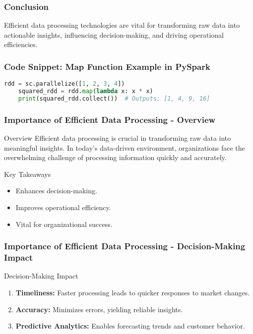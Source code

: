 \documentclass[aspectratio=169]{beamer}
\begin{document}
\begin{frame}[fragile]
    \frametitle{Conclusion}
    Efficient data processing technologies are vital for transforming raw data into actionable insights, influencing decision-making, and driving operational efficiencies.
\end{frame}

\begin{frame}[fragile]
    \frametitle{Code Snippet: Map Function Example in PySpark}
    \begin{lstlisting}[language=Python]
    rdd = sc.parallelize([1, 2, 3, 4])
    squared_rdd = rdd.map(lambda x: x * x)
    print(squared_rdd.collect())  # Outputs: [1, 4, 9, 16]
    \end{lstlisting}
\end{frame}

\begin{frame}[fragile]
    \frametitle{Importance of Efficient Data Processing - Overview}
    \begin{block}{Overview}
        Efficient data processing is crucial in transforming raw data into meaningful insights. In today's data-driven environment, organizations face the overwhelming challenge of processing information quickly and accurately.
    \end{block}
    \begin{block}{Key Takeaways}
        \begin{itemize}
            \item Enhances decision-making.
            \item Improves operational efficiency.
            \item Vital for organizational success.
        \end{itemize}
    \end{block}
\end{frame}

\begin{frame}[fragile]
    \frametitle{Importance of Efficient Data Processing - Decision-Making Impact}
    \begin{block}{Decision-Making Impact}
        \begin{enumerate}
            \item \textbf{Timeliness:} Faster processing leads to quicker responses to market changes.
            \item \textbf{Accuracy:} Minimizes errors, yielding reliable insights.
            \item \textbf{Predictive Analytics:} Enables forecasting trends and customer behavior.
        \end{enumerate}  
    \end{block}
\end{frame}
\end{document}
